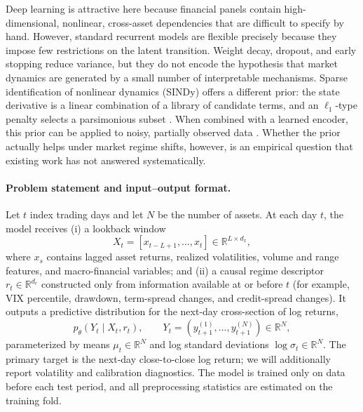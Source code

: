 \documentclass{article}
\begin{document}
Deep learning is attractive here because financial panels contain high-dimensional, nonlinear, cross-asset dependencies that are difficult to specify by hand. However, standard recurrent models are flexible precisely because they impose few restrictions on the latent transition. Weight decay, dropout, and early stopping reduce variance, but they do not encode the hypothesis that market dynamics are generated by a small number of interpretable mechanisms. Sparse identification of nonlinear dynamics (SINDy) offers a different prior: the state derivative is a linear combination of a library of candidate terms, and an $\ell_1$-type penalty selects a parsimonious subset \citep{brunton2016}. When combined with a learned encoder, this prior can be applied to noisy, partially observed data \citep{champion2019,gao2026sindyshred}. Whether the prior actually helps under market regime shifts, however, is an empirical question that existing work has not answered systematically.

\paragraph{Problem statement and input--output format.}
Let $t$ index trading days and let $N$ be the number of assets. At each day $t$, the model receives (i) a lookback window
\begin{equation}
  X_t = [x_{t-L+1}, \ldots, x_t] \in \mathbb{R}^{L \times d_x},
\end{equation}
where $x_s$ contains lagged asset returns, realized volatilities, volume and range features, and macro-financial variables; and (ii) a causal regime descriptor $r_t \in \mathbb{R}^{d_r}$ constructed only from information available at or before $t$ (for example, VIX percentile, drawdown, term-spread changes, and credit-spread changes). It outputs a predictive distribution for the next-day cross-section of log returns,
\begin{equation}
  p_\theta(Y_t \mid X_t, r_t), \qquad
  Y_t = \left(y_{t+1}^{(1)}, \ldots, y_{t+1}^{(N)}\right) \in \mathbb{R}^{N},
\end{equation}
parameterized by means $\mu_t \in \mathbb{R}^{N}$ and log standard deviations $\log \sigma_t \in \mathbb{R}^{N}$. The primary target is the next-day close-to-close log return; we will additionally report volatility and calibration diagnostics. The model is trained only on data before each test period, and all preprocessing statistics are estimated on the training fold.
\end{document}
